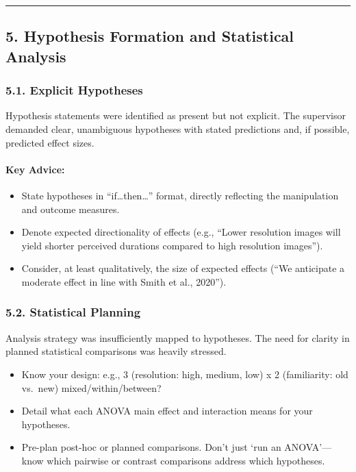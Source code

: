 \documentclass[
]{article}
\providecommand{\tightlist}{%
  \setlength{\itemsep}{0pt}\setlength{\parskip}{0pt}}
\begin{document}
\begin{center}\rule{0.5\linewidth}{0.5pt}\end{center}

\subsection{5. Hypothesis Formation and Statistical
Analysis}\label{hypothesis-formation-and-statistical-analysis}

\subsubsection{5.1. Explicit Hypotheses}\label{explicit-hypotheses}

Hypothesis statements were identified as present but not explicit. The
supervisor demanded clear, unambiguous hypotheses with stated
predictions and, if possible, predicted effect sizes.

\paragraph{\texorpdfstring{\textbf{Key
Advice:}}{Key Advice:}}\label{key-advice-4}

\begin{itemize}
\tightlist
\item
  State hypotheses in ``if\ldots then\ldots'' format, directly
  reflecting the manipulation and outcome measures.
\item
  Denote expected directionality of effects (e.g., ``Lower resolution
  images will yield shorter perceived durations compared to high
  resolution images'').
\item
  Consider, at least qualitatively, the size of expected effects (``We
  anticipate a moderate effect in line with Smith et al., 2020'').
\end{itemize}

\subsubsection{5.2. Statistical Planning}\label{statistical-planning}

Analysis strategy was insufficiently mapped to hypotheses. The need for
clarity in planned statistical comparisons was heavily stressed.

\begin{itemize}
\tightlist
\item
  Know your design: e.g., 3 (resolution: high, medium, low) x 2
  (familiarity: old vs.~new) mixed/within/between?
\item
  Detail what each ANOVA main effect and interaction means for your
  hypotheses.
\item
  Pre-plan post-hoc or planned comparisons. Don't just `run an
  ANOVA'---know which pairwise or contrast comparisons address which
  hypotheses.
\end{itemize}
\end{document}

